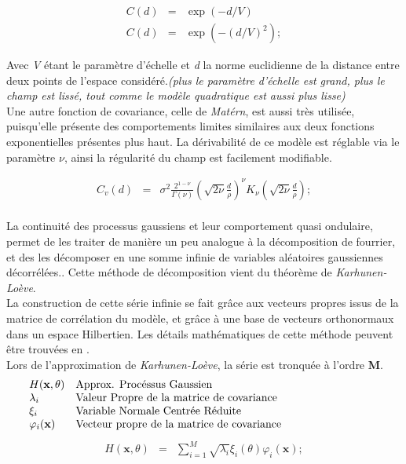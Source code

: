 \documentclass[a4paper,10pt]{article}
\begin{document}
   \begin{eqnarray}
      				C(d) & = & \exp(-d/V)\\
                    C(d) & = & \exp(-(d/V)^{2});
   \end{eqnarray}
   
Avec \emph{V} étant le paramètre d'échelle et \emph{d} la norme euclidienne de la distance entre deux points de l'espace considéré.\textit{(plus le paramètre d'échelle est grand, plus le champ est lissé, tout comme le modèle quadratique est aussi plus lisse)}\\
Une autre fonction de covariance, celle de \emph{Matérn}, est aussi très utilisée, puisqu'elle présente des comportements limites similaires aux deux fonctions exponentielles présentes plus haut. La dérivabilité de ce modèle est réglable via le paramètre $\nu$, ainsi la régularité du champ est facilement modifiable.

   \begin{eqnarray}
C_{v}(d) & = & \sigma^{2}\frac{2^{1-\nu}}{\Gamma(\nu)}\left(\sqrt{2\nu}\frac{d}{\rho}\right)^{\nu}K_{\nu}\left(\sqrt{2\nu}\frac{d}{\rho}\right);
   \end{eqnarray}\\

La continuité des processus gaussiens et leur comportement quasi ondulaire, permet de les traiter de manière un peu analogue à la décomposition de fourrier, et des les décomposer en une somme infinie de variables aléatoires gaussiennes décorrélées.. Cette méthode de décomposition vient du théorème de \emph{Karhunen-Loève}. \\
La construction de cette série infinie se fait grâce aux vecteurs propres issus de la matrice de corrélation du modèle, et grâce à une base de vecteurs orthonormaux dans un espace Hilbertien. Les détails mathématiques de cette méthode peuvent être trouvées en  \cite{Sudret2000Jan}. \\
Lors de l’approximation de \emph{Karhunen-Loève}, la série est tronquée à l'ordre \textbf{M}.
   \[
      \begin{array}{lp{0.8\linewidth}}
         H(\textbf{x}, \theta) & Approx. Procéssus Gaussien \\
         \lambda_{i}          & Valeur Propre de la matrice de covariance \\
         \xi_{i}             & Variable Normale Centrée Réduite \\
         \varphi_{i}(\textbf{x}) & Vecteur propre de la matrice de covariance
      \end{array}
   \]
   \begin{eqnarray}
H(\textbf{x}, \theta) & = & \sum_{i=1}^{M}\sqrt{\lambda_{i}}\xi_{i}(\theta)\varphi_{i}(\textbf{x});
   \end{eqnarray}\\
\end{document}
